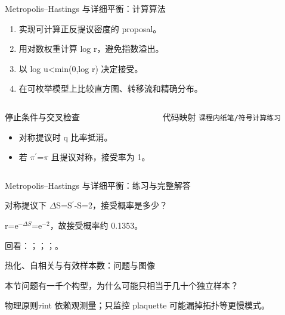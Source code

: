\begin{frame}[t]{Metropolis--Hastings 与详细平衡：计算算法}
\footnotesize
{}\begin{enumerate}
\item 实现可计算正反提议密度的 proposal。
\item 用对数权重计算 log r，避免指数溢出。
\item 以 log u<min(0,log r) 决定接受。
\item 在可枚举模型上比较直方图、转移流和精确分布。
\end{enumerate}\begin{columns}[T,onlytextwidth]
\begin{block}{停止条件与交叉检查}\scriptsize\begin{itemize}
\item[\CheckMark] 对称提议时 q 比率抵消。
\item[\CheckMark] 若 \ensuremath{\pi}\ensuremath{^{\prime}}=\ensuremath{\pi} 且提议对称，接受率为 1。
\end{itemize}\end{block}
\begin{block}{代码映射}
\scriptsize \texttt{课程内纸笔/\allowbreak{}符号计算练习}
\end{block}\end{columns}\end{frame}

\begin{frame}[t]{Metropolis--Hastings 与详细平衡：练习与完整解答}
\footnotesize
\begin{block}{}对称提议下 \ensuremath{\Delta}S=S\ensuremath{^{\prime}}-S=2，接受概率是多少？\end{block}
\begin{exampleblock}{}r=e\ensuremath{^{-\Delta{}S}}=e\ensuremath{^{-2}}，故接受概率约 0.1353。\end{exampleblock}
\vfill
\scriptsize 回看：；；；。
\end{frame}

\begin{frame}[t]{热化、自相关与有效样本数：问题与图像}
\footnotesize
\begin{block}{本节问题}有一千个构型，为什么可能只相当于几十个独立样本？\end{block}
\begin{block}{物理原则}\quad \ensuremath{\tau}int 依赖观测量；只监控 plaquette 可能漏掉拓扑等更慢模式。\end{block}
\end{frame}

